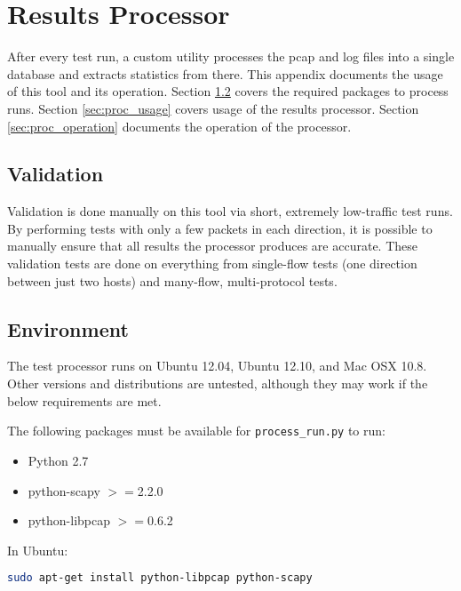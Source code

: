\chapter{Results Processor}
\label{chp:processor}

\par After every test run, a custom utility processes the pcap and log files into a single database and extracts statistics from there. This appendix documents the usage of this tool and its operation. Section \ref{sec:proc_env} covers the required packages to process runs. Section \ref{sec:proc_usage} covers usage of the results processor. Section \ref{sec:proc_operation} documents the operation of the processor.

\section{Validation}
\par Validation is done manually on this tool via short, extremely low-traffic test runs. By performing tests with only a few packets in each direction, it is possible to manually ensure that all results the processor produces are accurate. These validation tests are done on everything from single-flow tests (one direction between just two hosts) and many-flow, multi-protocol tests.

\section{Environment}
\label{sec:proc_env}
\par The test processor runs on Ubuntu 12.04, Ubuntu 12.10, and Mac OSX 10.8. Other versions and distributions are untested, although they may work if the below requirements are met. 

\par The following packages must be available for \texttt{process\_run.py} to run:

{\singlespace
\begin{itemize}
\item Python 2.7
\item python-scapy $>=$2.2.0
\item python-libpcap $>=$0.6.2
\end{itemize}
}

\par In Ubuntu:
\begin{lstlisting}[language=bash]
sudo apt-get install python-libpcap python-scapy
\end{lstlisting}

